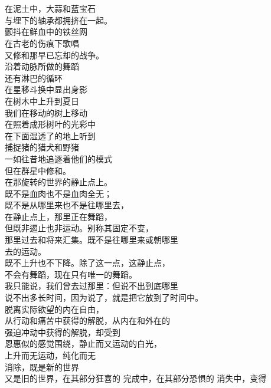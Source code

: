 \documentclass{article}
\begin{document}
 \\
 \\
在泥土中，大蒜和蓝宝石 \\
与埋下的轴承都拥挤在一起。 \\
颤抖在鲜血中的铁丝网 \\
在古老的伤痕下歌唱 \\
又修和那早已忘却的战争。 \\
沿着动脉所做的舞蹈 \\
还有淋巴的循环 \\
在星移斗换中显出身影 \\
在树木中上升到夏日 \\
我们在移动的树上移动 \\
在照着成形树叶的光彩中 \\
在下面湿透了的地上听到 \\
捕捉猪的猎犬和野猪 \\
一如往昔地追逐着他们的模式 \\
但在群星中修和。 \\
在那旋转的世界的静止点上。 \\
既不是血肉也不是血肉全无； \\
既不是从哪里来也不是往哪里去， \\
在静止点上，那里正在舞蹈， \\
但既非遏止也非运动。别称其固定不变， \\
那里过去和将来汇集。既不是往哪里来或朝哪里 \\
去的运动。 \\
既不上升也不下降。除了这一点，这静止点， \\
不会有舞蹈，现在只有唯一的舞蹈。 \\
我只能说，我们曾去过那里：但说不出到底哪里 \\
说不出多长时间，因为说了，就是把它放到了时间中。 \\
脱离实际欲望的内在自由， \\
从行动和痛苦中获得的解脱，从内在和外在的 \\
强迫冲动中获得的解脱，却受到 \\
恩惠似的感觉围绕，静止而又运动的白光， \\
上升而无运动，纯化而无 \\
消除，既是新的世界 \\
又是旧的世界，在其部分狂喜的
完成中，在其部分恐惧的
消失中，变得

\newpage 
\end{document}
